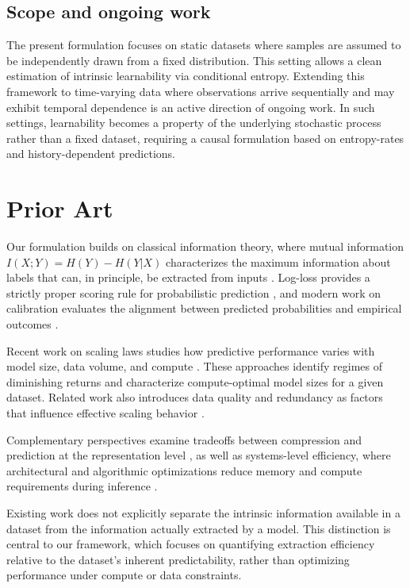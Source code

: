 \documentclass{article}
\begin{document}
\subsection{Scope and ongoing work}
The present formulation focuses on static datasets where samples are assumed 
to be independently drawn from a fixed distribution. This setting allows a 
clean estimation of intrinsic learnability via conditional entropy. 
Extending this framework to time-varying data where observations 
arrive sequentially and may exhibit temporal dependence is an active direction of ongoing work. 
In such settings, learnability becomes a property of the underlying stochastic process rather than a 
fixed dataset, requiring a causal formulation based on entropy-rates and history-dependent predictions.

\section{Prior Art}

Our formulation builds on classical information theory, where mutual information $I(X;Y)=H(Y)-H(Y|X)$ 
characterizes the maximum information about labels that can, in principle, be extracted from inputs \cite{cover_thomas}. 
Log-loss provides a strictly proper scoring rule for probabilistic prediction \cite{gneiting_scoring}, 
and modern work on calibration evaluates the alignment between predicted probabilities and empirical outcomes \cite{guo_calibration}.

Recent work on scaling laws studies how predictive performance varies with model size, data volume, 
and compute \cite{kaplan2020scaling, hoffmann2022chinchilla}. 
These approaches identify regimes of diminishing returns and characterize compute-optimal model 
sizes for a given dataset. Related work also introduces data quality and redundancy as factors that influence effective scaling behavior \cite{quality_scaling}.

Complementary perspectives examine tradeoffs between compression and prediction at the representation level \cite{tishby_ib, grunwald_mdl}, 
as well as systems-level efficiency, where architectural and algorithmic optimizations reduce memory and compute requirements during inference \cite{llm_flash}.

Existing work does not explicitly separate the intrinsic information available in a dataset from the information actually extracted by a model. 
This distinction is central to our framework, which focuses on quantifying extraction efficiency relative to the dataset’s inherent predictability, 
rather than optimizing performance under compute or data constraints.
\end{document}
